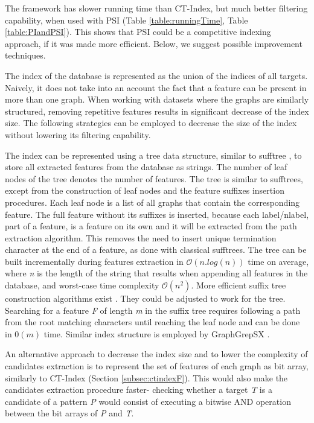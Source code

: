 \documentclass{l4proj}
\begin{document}
The framework has slower running time than CT-Index, but much better filtering capability, when used with PSI (Table \ref{table:runningTime}, Table \ref{table:PIandPSI}). This shows that PSI could be a competitive indexing approach, if it was made more efficient. Below, we suggest possible improvement techniques.

The index of the database is represented as the union of the indices of all targets. Naively, it does not take into an account the fact that a feature can be present in more than one graph. When working with datasets where the graphs are similarly structured, removing repetitive features results in significant decrease of the index size. The following strategies can be employed to decrease the size of the index without lowering its filtering capability.

The index can be represented using a \gls{tree} data structure, similar to \gls{sufftree} \cite{weiner:1973}, to store all extracted features from the database as strings. The number of leaf nodes of the tree denotes the number of features. The tree is similar to \glspl{sufftree}, except from the construction of leaf nodes and the feature suffixes insertion procedures. Each leaf node is a list of all graphs that contain the corresponding feature. The full feature without its suffixes is inserted, because each label/nlabel, part of a feature, is a feature on its own and it will be extracted from the path extraction algorithm. This removes the need to insert unique termination character at the end of a feature, as done with classical \glspl{sufftree}. The tree can be built incrementally during features extraction in $\mathcal{O}(n.log(n))$ time on average, where \emph{n} is the length of the string that results when appending all features in the database, and worst-case time complexity $\mathcal{O}(n^{2})$. More efficient suffix tree construction algorithms exist \cite{weiner:1973, McCreight:1976, Ukkonen:1995}. They could be adjusted to work for the tree. Searching for a feature \emph{F} of length \emph{m} in the suffix tree requires following a path from the root matching characters until reaching the leaf node and can be done in $\mathcal{0}(m)$ time. Similar index structure is employed by GraphGrepSX \cite{graphgrepsx}.

An alternative approach to decrease the index size and to lower the complexity of candidates extraction is to represent the set of features of each graph as bit array, similarly to CT-Index (Section \ref{subsec:ctindexF}). This would also make the candidates extraction procedure faster- checking whether a target \emph{T} is a candidate of a pattern \emph{P} would consist of executing a bitwise AND operation between the bit arrays of \emph{P} and \emph{T}.
\end{document}
